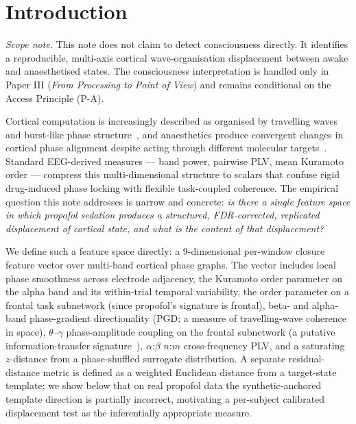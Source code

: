 \documentclass[11pt,a4paper]{article}
\begin{document}
\section{Introduction}

\noindent\emph{Scope note.} This note does not claim to detect consciousness directly. It identifies a reproducible, multi-axis cortical wave-organisation displacement between awake and anaesthetised states. The consciousness interpretation is handled only in Paper III (\emph{From Processing to Point of View}) and remains conditional on the Access Principle (P-A).

Cortical computation is increasingly described as organised by travelling waves and burst-like phase structure~\cite{miller2018working,lundqvist2016gamma,bastos2020laminar,davis2020spontaneous,muller2018cortical,zhang2018theta,alamia2019alpha}, and anaesthetics produce convergent changes in cortical phase alignment despite acting through different molecular targets~\cite{stoll2025convergent,purdon2013electroencephalogram,ching2010thalamocortical,lewis2012rapid}. Standard EEG-derived measures --- band power, pairwise PLV, mean Kuramoto order --- compress this multi-dimensional structure to scalars that confuse rigid drug-induced phase locking with flexible task-coupled coherence. The empirical question this note addresses is narrow and concrete: \emph{is there a single feature space in which propofol sedation produces a structured, FDR-corrected, replicated displacement of cortical state, and what is the content of that displacement?}

We define such a feature space directly: a $9$-dimensional per-window closure feature vector over multi-band cortical phase graphs. The vector includes local phase smoothness across electrode adjacency, the Kuramoto order parameter on the alpha band and its within-trial temporal variability, the order parameter on a frontal task subnetwork (since propofol's signature is frontal), beta- and alpha-band phase-gradient directionality (PGD; a measure of travelling-wave coherence in space), $\theta$--$\gamma$ phase-amplitude coupling on the frontal subnetwork (a putative information-transfer signature~\cite{tort2010measuring}), $\alpha$:$\beta$ $n$:$m$ cross-frequency PLV, and a saturating $z$-distance from a phase-shuffled surrogate distribution. A separate residual-distance metric is defined as a weighted Euclidean distance from a target-state template; we show below that on real propofol data the synthetic-anchored template direction is partially incorrect, motivating a per-subject calibrated displacement test as the inferentially appropriate measure.
\end{document}
